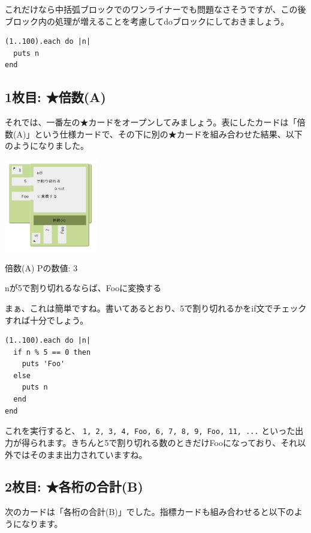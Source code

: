 \documentclass[index]{subfiles}
\begin{document}
これだけなら中括弧ブロックでのワンライナーでも問題なさそうですが、この後ブロック内の処理が増えることを考慮してdoブロックにしておきましょう。

\begin{lstlisting} 
(1..100).each do |n|
  puts n
end
\end{lstlisting}

  \subsection{1枚目: ★倍数(A)}

それでは、一番左の★カードをオープンしてみましょう。表にしたカードは「倍数(A)」という仕様カードで、その下に別の★カードを組み合わせた結果、以下のようになりました。

\begin{center}
  \includegraphics[height=4cm]{image/202_replay_1_1.png}
\end{center}

\begin{itembox}[l]{倍数(A)}
Pの数値: 3

nが5で割り切れるならば、Fooに変換する
\end{itembox}

まぁ、これは簡単ですね。書いてあるとおり、5で割り切れるかをif文でチェックすれば十分でしょう。

\begin{lstlisting}
(1..100).each do |n|
  if n % 5 == 0 then
    puts 'Foo'
  else
    puts n
  end
end
\end{lstlisting}

これを実行すると、 \verb+1, 2, 3, 4, Foo, 6, 7, 8, 9, Foo, 11, ...+ といった出力が得られます。きちんと5で割り切れる数のときだけFooになっており、それ以外ではそのまま出力されていますね。

  \subsection{2枚目: ★各桁の合計(B)}

次のカードは「各桁の合計(B)」でした。指標カードも組み合わせると以下のようになります。
\end{document}
